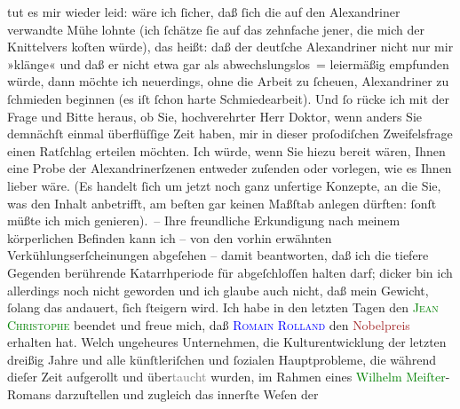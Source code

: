                tut es mir wieder leid: wäre ich ſicher, daß ſich die auf den Alexandriner verwandte
               Mühe lohnte (ich ſchätze ſie auf das zehnfache jener, die mich der Knittelvers koſten
               würde), das heißt: daß der deutſche Alexandriner nicht nur mir »klänge« und daß er
               nicht etwa gar als abwechslungslos = leiermäßig empfunden würde, dann möchte ich
               neuerdings, ohne die Arbeit zu ſcheuen, Alexandriner zu ſchmieden beginnen (es iſt
               ſchon harte Schmiedearbeit).\pend
           \pstart
           Und ſo rücke ich mit der Frage und Bitte heraus, ob Sie, hochverehrter Herr Doktor,
               wenn anders Sie demnächſt einmal überflüſſige Zeit haben, mir {\pb}in dieser proſodiſchen Zweifelsfrage einen Ratſchlag
               erteilen möchten. Ich würde, wenn Sie hiezu bereit wären, Ihnen eine Probe der
               Alexandrinerſzenen entweder zuſenden oder vorlegen, wie es Ihnen lieber wäre. (Es
               handelt ſich um jetzt noch ganz unfertige Konzepte, an die Sie, was den Inhalt
               anbetrifft, am beſten gar keinen Maßſtab anlegen dürften: ſonſt müßte ich mich
               genieren). –\pend
           \pstart
           Ihre freundliche Erkundigung nach meinem körperlichen Befinden kann ich – von den
               vorhin erwähnten Verkühlungserſcheinungen abgeſehen – damit beantworten, daß ich die
               tiefere Gegenden berührende Katarrhperiode für
               abgeſchloſſen halten darf; dicker bin ich allerdings noch nicht geworden und ich
               glaube auch nicht, daß mein Gewicht, ſolang das \label{K_L02246_1v}\label{K_L02246_1h} andauert, {\pb}ſich ſteigern wird.\pend
           \pstart
           Ich habe in den letzten Tagen den \textcolor{green}{\textsc{Jean Christophe}}{}\ledrightnote{\textcolor{green}{Jean Christophe}} beendet und freue mich, daß \textcolor{blue}{\textsc{Romain Rolland}}{}\ledrightnote{\textcolor{blue}{Romain Rolland}} den \textcolor{brown}{Nobelpreis}{}\ledrightnote{\textcolor{brown}{Nobelpreis}} erhalten hat. Welch ungeheures
               Unternehmen, die Kulturentwicklung der letzten dreißig Jahre und alle künſtleriſchen
               und ſozialen Hauptprobleme, die während dieſer Zeit aufgerollt und
                  über\textcolor{gray}{taucht} wurden, im Rahmen eines \textcolor{green}{Wilhelm Meiſter}{}\ledrightnote{\textcolor{green}{Wilhelm Meister}}-Romans darzuſtellen und zugleich das innerſte Weſen der
